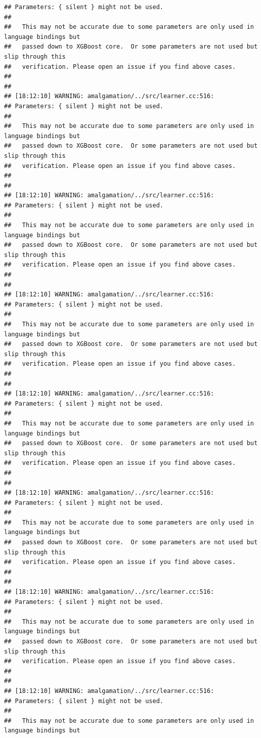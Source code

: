 \documentclass[AMS,STIX2COL]{WileyNJD-v2}\usepackage[]{graphicx}\usepackage[]{color}
\makeatletter
\newenvironment{kframe}{%
 \def\at@end@of@kframe{}%
 \ifinner\ifhmode%
  \def\at@end@of@kframe{\end{minipage}}%
  \begin{minipage}{\columnwidth}%
 \fi\fi%
 \def\FrameCommand##1{\hskip\@totalleftmargin \hskip-\fboxsep
 \colorbox{shadecolor}{##1}\hskip-\fboxsep
     \hskip-\linewidth \hskip-\@totalleftmargin \hskip\columnwidth}%
 \MakeFramed {\advance\hsize-\width
   \@totalleftmargin\z@ \linewidth\hsize
   \@setminipage}}%
 {\par\unskip\endMakeFramed%
 \at@end@of@kframe}
\newenvironment{knitrout}{}{} %
\makeatother
\begin{document}
\begin{knitrout}
\begin{kframe}
\begin{verbatim}
## Parameters: { silent } might not be used.
## 
##   This may not be accurate due to some parameters are only used in language bindings but
##   passed down to XGBoost core.  Or some parameters are not used but slip through this
##   verification. Please open an issue if you find above cases.
## 
## 
## [18:12:10] WARNING: amalgamation/../src/learner.cc:516: 
## Parameters: { silent } might not be used.
## 
##   This may not be accurate due to some parameters are only used in language bindings but
##   passed down to XGBoost core.  Or some parameters are not used but slip through this
##   verification. Please open an issue if you find above cases.
## 
## 
## [18:12:10] WARNING: amalgamation/../src/learner.cc:516: 
## Parameters: { silent } might not be used.
## 
##   This may not be accurate due to some parameters are only used in language bindings but
##   passed down to XGBoost core.  Or some parameters are not used but slip through this
##   verification. Please open an issue if you find above cases.
## 
## 
## [18:12:10] WARNING: amalgamation/../src/learner.cc:516: 
## Parameters: { silent } might not be used.
## 
##   This may not be accurate due to some parameters are only used in language bindings but
##   passed down to XGBoost core.  Or some parameters are not used but slip through this
##   verification. Please open an issue if you find above cases.
## 
## 
## [18:12:10] WARNING: amalgamation/../src/learner.cc:516: 
## Parameters: { silent } might not be used.
## 
##   This may not be accurate due to some parameters are only used in language bindings but
##   passed down to XGBoost core.  Or some parameters are not used but slip through this
##   verification. Please open an issue if you find above cases.
## 
## 
## [18:12:10] WARNING: amalgamation/../src/learner.cc:516: 
## Parameters: { silent } might not be used.
## 
##   This may not be accurate due to some parameters are only used in language bindings but
##   passed down to XGBoost core.  Or some parameters are not used but slip through this
##   verification. Please open an issue if you find above cases.
## 
## 
## [18:12:10] WARNING: amalgamation/../src/learner.cc:516: 
## Parameters: { silent } might not be used.
## 
##   This may not be accurate due to some parameters are only used in language bindings but
##   passed down to XGBoost core.  Or some parameters are not used but slip through this
##   verification. Please open an issue if you find above cases.
## 
## 
## [18:12:10] WARNING: amalgamation/../src/learner.cc:516: 
## Parameters: { silent } might not be used.
## 
##   This may not be accurate due to some parameters are only used in language bindings but

\end{verbatim}
\end{kframe}
\end{knitrout}
\end{document}
